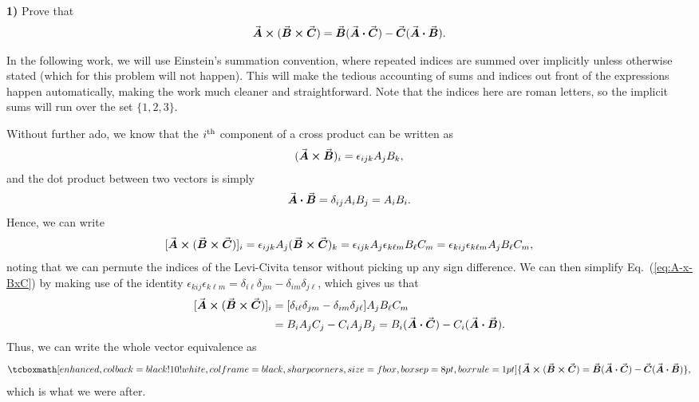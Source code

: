 \documentclass[12pt]{article}
\newcommand{\eref}[1]{Eq.~(\ref{eq:#1})}
\newcommand*{\eqbox}{\tcboxmath[
    enhanced,
    colback=black!10!white,
    colframe=black,
    sharp corners,
    size=fbox,
    boxsep=8pt,
    boxrule=1pt
]}
\newcommand{\prob}[2]{\textbf{#1)} #2}
\begin{document}
    
\prob{1}{
Prove that 
\begin{eqnarray}
    \label{eq:BAC-CAB}
    \va*{A} \cross (\va*{B} \cross \va*{C}) = \va*{B}(\va*{A} \vdot \va*{C}) - \va*{C}(\va*{A} \vdot \va*{B})
.\end{eqnarray}
}

In the following work, we will use Einstein's summation convention, where repeated indices are summed over implicitly unless otherwise stated (which for this problem will not happen).
This will make the tedious accounting of sums and indices out front of the expressions happen automatically, making the work much cleaner and straightforward.
Note that the indices here are roman letters, so the implicit sums will run over the set $\{ 1,2,3 \} $.

Without further ado, we know that the $i^{\rm th}$ component of a cross product can be written as
\begin{eqnarray}
    \label{eq:cross-product}
    (\va*{A} \cross \va*{B})_{i} = \epsilon_{ijk} A_{j}B_{k}
,\end{eqnarray}
and the dot product between two vectors is simply
\begin{eqnarray}
    \label{eq:dot-product}
    \va*{A} \vdot \va*{B} = \delta_{ij}A_{i}B_{j} = A_{i}B_{i}
.\end{eqnarray}
Hence, we can write
\begin{eqnarray}
    \label{eq:A-x-BxC}
    [\va*{A} \cross (\va*{B} \cross \va*{C})]_{i} = \epsilon_{ijk} A_{j}(\va*{B} \cross \va*{C})_{k} = \epsilon_{ijk} A_{j} \epsilon_{k \ell m} B_{\ell} C_{m} = \epsilon_{kij}\epsilon_{k \ell m} A_{j} B_{\ell} C_{m}
,\end{eqnarray}
noting that we can permute the indices of the Levi-Civita tensor without picking up any sign difference.
We can then simplify \eref{A-x-BxC} by making use of the identity $\epsilon_{kij}\epsilon_{k \ell m} = \delta_{i \ell} \delta_{jm} - \delta_{im}\delta_{j\ell}$, which gives us that
\begin{align}
    \label{eq:simplified-cross}
    [\va*{A} \cross (\va*{B} \cross \va*{C})]_{i} &= [\delta_{i\ell}\delta_{jm} - \delta_{im}\delta_{j\ell}]A_{j}B_{\ell}C_{m} \notag \\
    &= B_{i}A_{j}C_{j} - C_{i}A_{j}B_{j} = B_{i}(\va*{A} \vdot \va*{C}) - C_{i}(\va*{A} \vdot \va*{B})
.\end{align}
Thus, we can write the whole vector equivalence as
\begin{eqnarray}
    \label{eq:result}
    \eqbox{
        \va*{A} \cross (\va*{B} \cross \va*{C}) = \va*{B}(\va*{A} \vdot \va*{C}) - \va*{C}(\va*{A} \vdot \va*{B})
    }
,\end{eqnarray}
which is what we were after.
\end{document}
